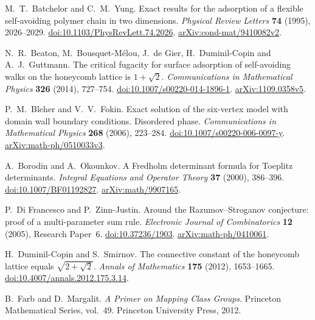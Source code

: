 M.~T.~Batchelor and C.~M.~Yung.
Exact results for the adsorption of a flexible self-avoiding polymer chain
in two dimensions.
\emph{Physical Review Letters} \textbf{74} (1995), 2026--2029.
\href{https://doi.org/10.1103/PhysRevLett.74.2026}{doi:10.1103/PhysRevLett.74.2026}.
\href{https://arxiv.org/abs/cond-mat/9410082v2}{arXiv:cond-mat/9410082v2}.

N.~R.~Beaton, M.~Bousquet-M\'elou, J.~de Gier, H.~Duminil-Copin and A.~J.~Guttmann.
The critical fugacity for surface adsorption of self-avoiding walks on the
honeycomb lattice is $1+\sqrt2$.
\emph{Communications in Mathematical Physics} \textbf{326} (2014), 727--754.
\href{https://doi.org/10.1007/s00220-014-1896-1}{doi:10.1007/s00220-014-1896-1}.
\href{https://arxiv.org/abs/1109.0358v5}{arXiv:1109.0358v5}.

P.~M.~Bleher and V.~V.~Fokin.
Exact solution of the six-vertex model with domain wall boundary conditions.
Disordered phase.
\emph{Communications in Mathematical Physics} \textbf{268} (2006), 223--284.
\href{https://doi.org/10.1007/s00220-006-0097-y}{doi:10.1007/s00220-006-0097-y}.
\href{https://arxiv.org/abs/math-ph/0510033v3}{arXiv:math-ph/0510033v3}.

A.~Borodin and A.~Okounkov.
A Fredholm determinant formula for Toeplitz determinants.
\emph{Integral Equations and Operator Theory} \textbf{37} (2000), 386--396.
\href{https://doi.org/10.1007/BF01192827}{doi:10.1007/BF01192827}.
\href{https://arxiv.org/abs/math/9907165}{arXiv:math/9907165}.

P.~Di Francesco and P.~Zinn-Justin.
Around the Razumov--Stroganov conjecture: proof of a multi-parameter sum rule.
\emph{Electronic Journal of Combinatorics} \textbf{12} (2005), Research Paper~6.
\href{https://doi.org/10.37236/1903}{doi:10.37236/1903}.
\href{https://arxiv.org/abs/math-ph/0410061}{arXiv:math-ph/0410061}.

H.~Duminil-Copin and S.~Smirnov.
The connective constant of the honeycomb lattice equals $\sqrt{2+\sqrt2}$.
\emph{Annals of Mathematics} \textbf{175} (2012), 1653--1665.
\href{https://doi.org/10.4007/annals.2012.175.3.14}{doi:10.4007/annals.2012.175.3.14}.

B.~Farb and D.~Margalit.
\emph{A Primer on Mapping Class Groups}.
Princeton Mathematical Series, vol.~49.
Princeton University Press, 2012.

